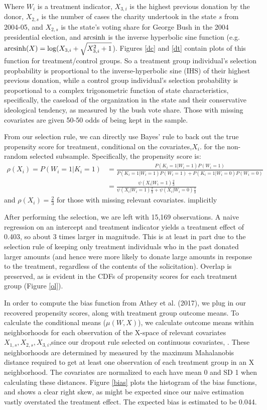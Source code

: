 \documentclass{article}
\begin{document}
Where $W_i$ is a treatment indicator, $X_{3,i}$ is the highest previous donation by the donor, $X_{2,s}$ is the number of cases the charity undertook in the state $s$ from 2004-05, and $X_{2,s}$ is the state's voting share for George Bush in the 2004 presidential election, and $\mathrm{arcsinh}$ is the inverse hyperbolic sine function (e.g. $\mathrm{arcsinh}(X) = \log(X_{3,i} + \sqrt{X_{3,i} ^ 2 + 1}$). Figures \ref{dc} and \ref{dt} contain plots of this function for treatment/control groups.
So a treatment group individual's selection propbability is proportional to the inverse-hyperbolic sine (IHS) of their highest previous donation, while a control group individual's selection probability is proportional to a complex trigonometric function of state characteristics, specifically, the caseload of the organization in the state and their conservative ideological tendency, as measured by the bush vote share. Those with missing covariates are given 50-50 odds of being kept in the sample. 

From our selection rule, we can directly use Bayes' rule to back out the true propensity score for treatment, conditional on the covariates,$X_i$. for the non-random selected subsample. Specifically, the propensity score is:
\begin{align*}
\rho(X_i) = P(W_i=1|K_i=1) &= \frac{P(K_i=1|W_i=1)P(W_i=1) }{P(K_i=1|W_i=1)P(W_i=1) + P(K_i=1|W_i=0)P(W_i=0) } \\
 &= \frac{\psi(X_i|W_i=1)\frac{2}{3}}{ \psi(X_i|W_i=1)\frac{2}{3} + \psi(X_i|W_i=0)\frac{1}{3}}
\end{align*}
and $\rho(X_i)=\frac{2}{3}$ for those with missing relevant covariates. implicitly

After performing the selection, we are left with 15,169 observations. A naive regression on an intercept and treatment indicator yields a treatment effect of 0.403, so about 3 times larger in magnitude. This is at least in part due to the selection rule of keeping only treatment individuals who in the past donated larger amounts (and hence were more likely to donate large amounts in response to the treatment, regardless of the contents of the solicitation). Overlap is preserved, as is evident in the CDFs of propensity scores for each treatment group (Figure \ref{ol}). 

In order to compute the bias function from Athey et al. (2017), we plug in our recovered propensity scores, along with treatment group outcome means. To calculate the  conditional means ($\mu(W,X)$), we calculate outcome means within neighborhoods for each observation of the X-space of relevant covariates $X_{1,s},X_{2,s},X_{3,i}$,since our dropout rule selected on continuous covariates, . These neighborhoods are determined by  measured by the maximum Mahalanobis distance required to get at least one observation of each treatment group in an X neighborhood. The covariates are normalized to each have mean 0 and SD 1 when calculating these distances. Figure \ref{bias} plots the histogram of the bias functions, and shows a clear right skew, as might be expected since our naive estimation vastly overstated the treatment effect. The expected bias is estimated to be 0.044.
\end{document}
